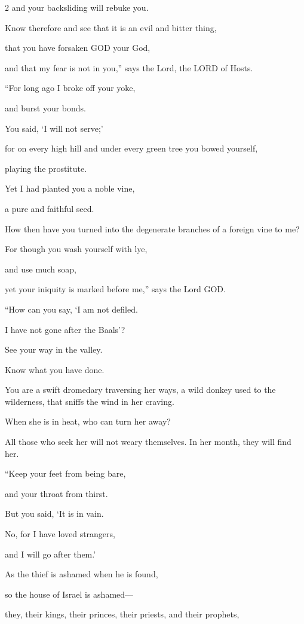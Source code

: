 \begin{multicols}{2}
	and your backsliding will rebuke you.
	
	Know therefore and see that it is an evil and bitter thing,
	
	that you have forsaken GOD your God,
	
	and that my fear is not in you,” says the Lord, the LORD of Hosts.
	
	
	\myverse{}“For long ago I broke off your yoke,
	
	and burst your bonds.
	
	You said, ‘I will not serve;’
	
	for on every high hill and under every green tree you bowed yourself,
	
	playing the prostitute.
	
	
	\myverse{}Yet I had planted you a noble vine,
	
	a pure and faithful seed.
	
	How then have you turned into the degenerate branches of a foreign vine to me?
	
	
	\myverse{}For though you wash yourself with lye,
	
	and use much soap,
	
	yet your iniquity is marked before me,” says the Lord GOD.
	
	
	\myverse{}“How can you say, ‘I am not defiled.
	
	I have not gone after the Baals’?
	
	See your way in the valley.
	
	Know what you have done.
	
	You are a swift dromedary traversing her ways, \myverse{}a wild donkey used to the wilderness, that sniffs the wind in her craving.
	
	When she is in heat, who can turn her away?
	
	All those who seek her will not weary themselves. In her month, they will find
	her.
	
	
	\myverse{}“Keep your feet from being bare,
	
	and your throat from thirst.
	
	But you said, ‘It is in vain.
	
	No, for I have loved strangers,
	
	and I will go after them.’
	
	
	\myverse{}As the thief is ashamed when he is found,
	
	so the house of Israel is ashamed—
	
	they, their kings, their princes, their priests, and their prophets,
	

\end{multicols}
